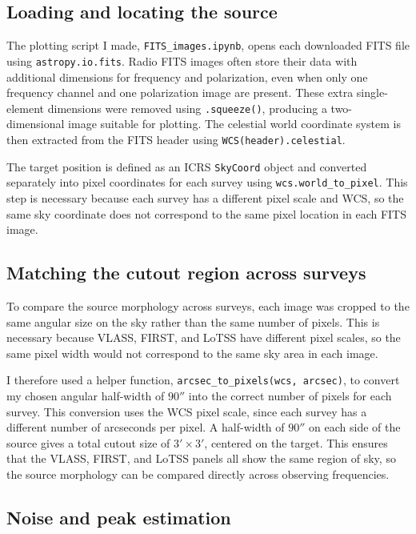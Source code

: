 \documentclass[11pt]{article}
\begin{document}
\subsection{Loading and locating the source}

The plotting script I made, \texttt{FITS\_images.ipynb}, opens each downloaded FITS file using \texttt{astropy.io.fits}. Radio FITS images often store their data with additional dimensions for frequency and polarization, even when only one frequency channel and one polarization image are present. These extra single-element dimensions were removed using \texttt{.squeeze()}, producing a two-dimensional image suitable
for plotting. The celestial world coordinate system is then extracted from the FITS header using \texttt{WCS(header).celestial}.

The target position is defined as an ICRS \texttt{SkyCoord} object and converted separately into pixel coordinates for each survey using
\texttt{wcs.world\_to\_pixel}. This step is necessary because each survey has a different pixel scale and WCS, so the same sky coordinate does not correspond to the same pixel location in each FITS image.

\subsection{Matching the cutout region across surveys}
\label{ssec:crop}

To compare the source morphology across surveys, each image was cropped to the same angular size on the sky rather than the same number of  pixels. This is necessary because VLASS, FIRST, and LoTSS have different pixel scales, so the same pixel width would not correspond to the same sky area in each image.

I therefore used a helper function, \texttt{arcsec\_to\_pixels(wcs, arcsec)}, to convert my chosen angular half-width of $90''$ into the correct number of pixels for each survey. This conversion uses the WCS pixel scale, since each survey has a different number of arcseconds per pixel. A half-width of $90''$ on each side of the source gives a total cutout size of $3' \times 3'$, centered on the target. This ensures that the VLASS, FIRST, and LoTSS panels all show the same region of sky, so the source morphology can be compared directly across observing frequencies.

\subsection{Noise and peak estimation}
\end{document}
